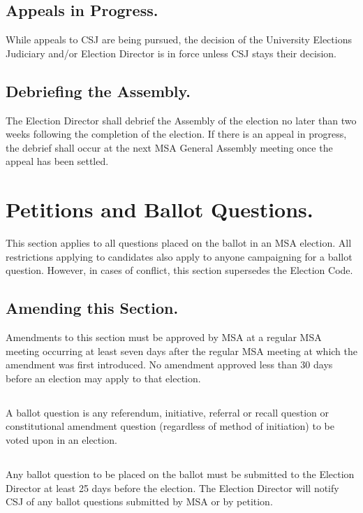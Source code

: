 \subsection{Appeals in Progress.}
While appeals to CSJ are being pursued, the decision of the University Elections Judiciary and/or Election Director is in force unless CSJ stays their decision.
\subsection{Debriefing the Assembly.}
The Election Director shall debrief the Assembly of the election no later than two weeks following the completion of the election. If there is an appeal in progress, the debrief shall occur at the next MSA General Assembly meeting once the appeal has been settled.

\section{Petitions and Ballot Questions.}
This section applies to all questions placed on the ballot in an MSA election.  All restrictions applying to candidates also apply to anyone campaigning for a ballot question.  However, in cases of conflict, this section supersedes the Election Code.

\subsection{Amending this Section.}
Amendments to this section must be approved by MSA at a regular MSA meeting occurring at least seven days after the regular MSA meeting at which the amendment was first introduced.  No amendment approved less than 30 days before an election may apply to that election.

\subsection{}
A ballot question is any referendum, initiative, referral or recall question or constitutional amendment question (regardless of method of initiation) to be voted upon in an election.

\subsection{}
Any ballot question to be placed on the ballot must be submitted to the Election Director at least 25 days before the election.  The Election Director will notify CSJ of any ballot questions submitted by MSA or by petition.  

